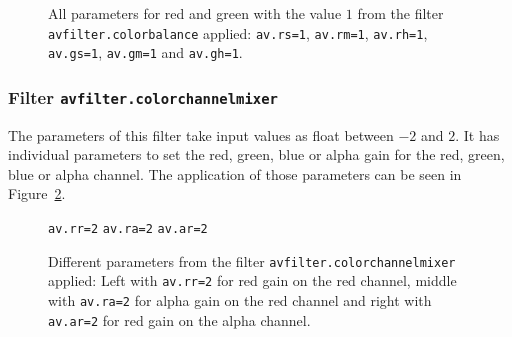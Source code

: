 \documentclass[../MasterThesis.tex]{subfiles}
\begin{document}
\begin{figure}[H]
	\begin{center}
		\label{figure:cb_yellow}
		\caption[Red and green parameters set to $1$ with \texttt{avfilter.colorbalance}.]{All parameters for red and green with the value $1$  from the filter \texttt{avfilter.colorbalance} applied: \texttt{av.rs=1}, \texttt{av.rm=1}, \texttt{av.rh=1}, \texttt{av.gs=1}, \texttt{av.gm=1} and \texttt{av.gh=1}.}
	\end{center}
\end{figure}














\subsubsection*{Filter \texttt{avfilter.colorchannelmixer}}

The parameters of this filter take input values as float between $-2$ and $2$. It has individual parameters to set the red, green, blue or alpha gain for the red, green, blue or alpha channel. The application of those parameters can be seen in Figure~\ref{figure:rrraar}.

\begin{figure}[H]
	\begin{center}
		\small{
			\texttt{av.rr=2} \hspace*{0.22\textwidth} \texttt{av.ra=2} \hspace*{0.23\textwidth} \texttt{av.ar=2}}
		\caption[Different parameters from \texttt{avfilter.colorchannelmixer} applied.]{Different parameters from the filter \texttt{avfilter.colorchannelmixer} applied: Left with \texttt{av.rr=2} for red gain on the red channel, middle with \texttt{av.ra=2} for alpha gain on the red channel and right with \texttt{av.ar=2} for red gain on the alpha channel.}
		\label{figure:rrraar}
	\end{center}
\end{figure}
\end{document}
